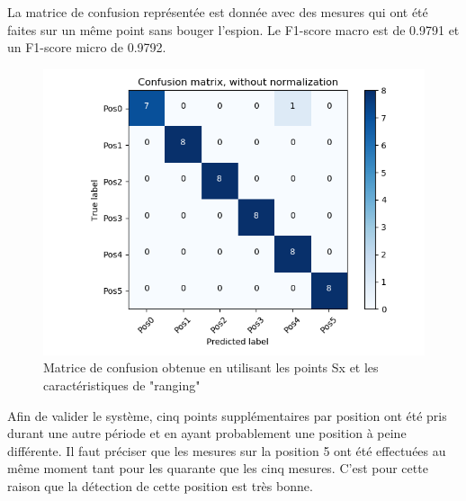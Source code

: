La matrice de confusion représentée est donnée avec des mesures qui ont été faites sur un même point sans bouger l'espion. Le F1-score macro est de 0.9791 et un F1-score micro de 0.9792.  

\begin{figure}[htp]
 \begin{center}
  \includegraphics[scale=0.5]{figures/mat_pos_Sx_raw.png}
  \caption{Matrice de confusion obtenue en utilisant les points Sx et les caractéristiques de "ranging"}
  \label{fig:matPosSxTRaw} %
 \end{center}
\end{figure}

Afin de valider le système, cinq points supplémentaires par position ont été pris durant une autre période et en ayant probablement une position à peine différente. Il faut préciser que les mesures sur la position 5 ont été effectuées au même moment tant pour les quarante que les cinq mesures. C'est pour cette raison que la détection de cette position est très bonne. 

